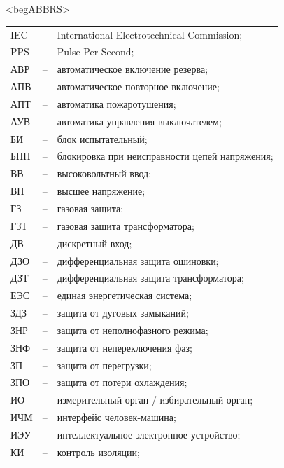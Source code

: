 \color{unimain}\section*{}
{\color{white}\fontsize{0.1pt}{0.1pt}\selectfont<begABBRS>}
\color{black}
\begin{longtable}{>{\raggedright\arraybackslash}m{2cm}>{\raggedright\arraybackslash}m{0.5cm}>{\raggedright\arraybackslash}m{20cm}}
\endfirsthead\endhead\endfoot\endlastfoot
IEC & -- &  International Electrotechnical Commission; \\
PPS & -- & Pulse Per Second; \\
АВР & -- & автоматическое включение резерва; \\
АПВ & -- & автоматическое повторное включение; \\
АПТ & -- & автоматика пожаротушения; \\
АУВ & -- & автоматика управления выключателем; \\
БИ & -- & блок испытательный; \\
БНН & -- & блокировка при неисправности цепей напряжения; \\
ВВ & -- & высоковольтный ввод; \\
ВН & -- & высшее напряжение; \\
ГЗ & -- & газовая защита; \\
ГЗТ & -- & газовая защита трансформатора; \\
ДВ & -- & дискретный вход; \\
ДЗО & -- & дифференциальная защита ошиновки; \\
ДЗТ & -- & дифференциальная защита трансформатора; \\
ЕЭС & -- & единая энергетическая система; \\
ЗДЗ & -- & защита от дуговых замыканий; \\
ЗНР & -- & защита от неполнофазного режима; \\
ЗНФ & -- & защита от непереключения фаз; \\
ЗП & -- & защита от перегрузки; \\
ЗПО & -- & защита от потери охлаждения; \\
ИО & -- & измерительный орган / избирательный орган; \\
ИЧМ & -- & интерфейс человек-машина; \\
ИЭУ & -- & интеллектуальное электронное устройство; \\
КИ & -- & контроль изоляции; \\

\end{longtable}
